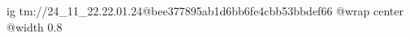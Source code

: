  
 
 
 
 

\qqSecOrig


\ifcmt
  ig tm://24_11_22.22.01.24@bee377895ab1d6bb6fe4cbb53bbdef66
  @wrap center
  @width 0.8
\fi


